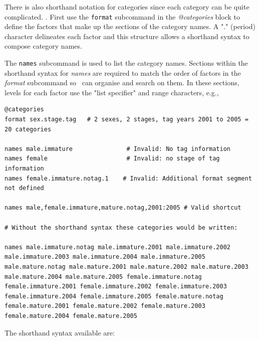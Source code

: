 There is also shorthand notation for categories since each category can be quite complicated. \label{sec:Categories}. First use the \texttt{format} subcommand in the \textit{@categories} block to define the factors that make up the sections of the category names. A "." (period) character delineates each factor and this structure allows a shorthand syntax to compose category names.

The \texttt{names} subcommand is used to list the category names. Sections within the shorthand syntax for \textit{names} are required to match the order of factors in the \textit{format} subcommand so \CNAME\ can organise and search on them. In these sections, levels for each factor use the "list specifier" and range characters, e.g.,

{\small{\begin{lstlisting}
@categories
format sex.stage.tag   # 2 sexes, 2 stages, tag years 2001 to 2005 = 20 categories

names male.immature               # Invalid: No tag information
names female                      # Invalid: no stage of tag information
names female.immature.notag.1    # Invalid: Additional format segment not defined

names male,female.immature,mature.notag,2001:2005 # Valid shortcut

# Without the shorthand syntax these categories would be written:

names male.immature.notag male.immature.2001 male.immature.2002 male.immature.2003 male.immature.2004 male.immature.2005 male.mature.notag male.mature.2001 male.mature.2002 male.mature.2003 male.mature.2004 male.mature.2005 female.immature.notag female.immature.2001 female.immature.2002 female.immature.2003 female.immature.2004 female.immature.2005 female.mature.notag female.mature.2001 female.mature.2002 female.mature.2003 female.mature.2004 female.mature.2005
\end{lstlisting}}}

The shorthand syntax available are: 

